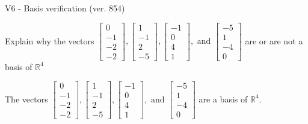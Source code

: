 \begin{exercise}
  \begin{exerciseTitle}V6 - Basis verification (ver. 854)\end{exerciseTitle}
  \begin{exerciseStatement}
    Explain why the vectors \(\left[\begin{array}{r}
0 \\
-1 \\
-2 \\
-2
\end{array}\right] , \left[\begin{array}{r}
1 \\
-1 \\
2 \\
-5
\end{array}\right] , \left[\begin{array}{r}
-1 \\
0 \\
4 \\
1
\end{array}\right] , \text{ and } \left[\begin{array}{r}
-5 \\
1 \\
-4 \\
0
\end{array}\right]\) are or are not a basis of \(\mathbb{R}^4\)	


  \end{exerciseStatement}
  \begin{exerciseAnswer}
   The vectors \(\left[\begin{array}{r}
0 \\
-1 \\
-2 \\
-2
\end{array}\right] , \left[\begin{array}{r}
1 \\
-1 \\
2 \\
-5
\end{array}\right] , \left[\begin{array}{r}
-1 \\
0 \\
4 \\
1
\end{array}\right] , \text{ and } \left[\begin{array}{r}
-5 \\
1 \\
-4 \\
0
\end{array}\right]\) 
  	 are  a basis of \(\mathbb{R}^4\).
  


  \end{exerciseAnswer}
\end{exercise}